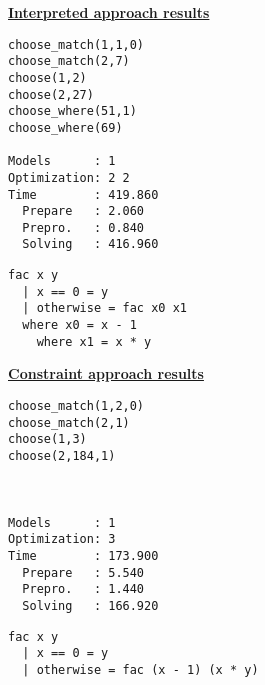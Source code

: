 \begin{multicols*}{2}
\underline{\textbf{Interpreted approach results}}
\begin{lstlisting}
choose_match(1,1,0)
choose_match(2,7)
choose(1,2) 
choose(2,27) 
choose_where(51,1)
choose_where(69) 

Models      : 1     
Optimization: 2 2 
Time        : 419.860
  Prepare   : 2.060
  Prepro.   : 0.840
  Solving   : 416.960
\end{lstlisting}

\begin{lstlisting}
fac x y
  | x == 0 = y
  | otherwise = fac x0 x1
  where x0 = x - 1
  	where x1 = x * y
\end{lstlisting}
\vspace*{\fill}
\columnbreak
\underline{\textbf{Constraint approach results}}
\begin{lstlisting}
choose_match(1,2,0)
choose_match(2,1) 
choose(1,3) 
choose(2,184,1) 

 
 
Models      : 1     
Optimization: 3 
Time        : 173.900
  Prepare   : 5.540
  Prepro.   : 1.440
  Solving   : 166.920

\end{lstlisting}
\begin{lstlisting}
fac x y
  | x == 0 = y
  | otherwise = fac (x - 1) (x * y)
\end{lstlisting}
\end{multicols*}
\pagebreak
